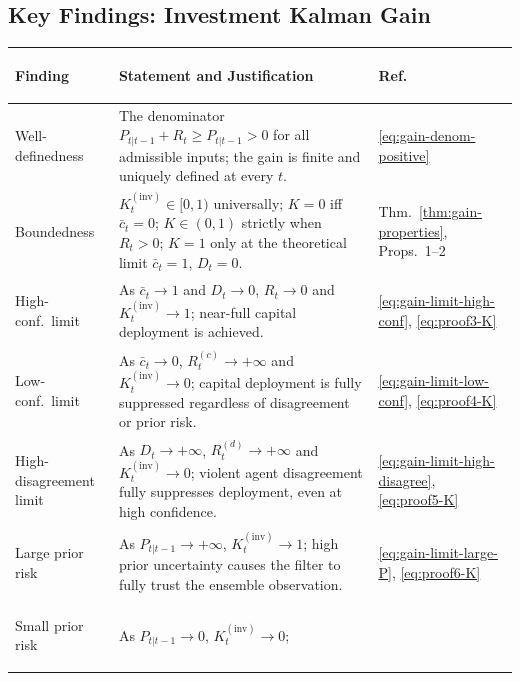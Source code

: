 \documentclass[12pt,openany]{book}
\numberwithin{equation}{chapter}
\theoremstyle{plain}
\theoremstyle{definition}
\theoremstyle{remark}
\renewcommand{\arraystretch}{1.2}
\begin{document}
\subsection{Key Findings: Investment Kalman Gain}

\begin{center}
\renewcommand{\arraystretch}{1.50}
\begin{tabularx}{\linewidth}{%
  >{\bfseries\raggedright\arraybackslash}p{3.8cm}
  >{\raggedright\arraybackslash}X
  >{\centering\arraybackslash}p{2.6cm}}
\hline
\textbf{Finding} & \textbf{Statement and Justification}
  & \textbf{Ref.} \\
\hline
Well-definedness
  & The denominator $P_{t|t-1} + R_t \geq P_{t|t-1} > 0$
    for all admissible inputs; the gain is finite and
    uniquely defined at every $t$.
  & \eqref{eq:gain-denom-positive} \\
\hline
Boundedness
  & $K_t^{(\mathrm{inv})} \in [0,1)$ universally;
    $K = 0$ iff $\bar{c}_t = 0$;
    $K \in (0,1)$ strictly when $R_t > 0$;
    $K = 1$ only at the theoretical limit
    $\bar{c}_t = 1$, $D_t = 0$.
  & Thm.~\ref{thm:gain-properties},
    Props.~1--2 \\
\hline
High-conf.\ limit
  & As $\bar{c}_t \to 1$ and $D_t \to 0$,
    $R_t \to 0$ and $K_t^{(\mathrm{inv})} \to 1$;
    near-full capital deployment is achieved.
  & \eqref{eq:gain-limit-high-conf},
    \eqref{eq:proof3-K} \\
\hline
Low-conf.\ limit
  & As $\bar{c}_t \to 0$,
    $R_t^{(c)} \to +\infty$ and
    $K_t^{(\mathrm{inv})} \to 0$;
    capital deployment is fully suppressed
    regardless of disagreement or prior risk.
  & \eqref{eq:gain-limit-low-conf},
    \eqref{eq:proof4-K} \\
\hline
High-disagreement limit
  & As $D_t \to +\infty$,
    $R_t^{(d)} \to +\infty$ and
    $K_t^{(\mathrm{inv})} \to 0$;
    violent agent disagreement fully suppresses
    deployment, even at high confidence.
  & \eqref{eq:gain-limit-high-disagree},
    \eqref{eq:proof5-K} \\
\hline
Large prior risk
  & As $P_{t|t-1} \to +\infty$,
    $K_t^{(\mathrm{inv})} \to 1$;
    high prior uncertainty causes the filter
    to fully trust the ensemble observation.
  & \eqref{eq:gain-limit-large-P},
    \eqref{eq:proof6-K} \\
\hline
Small prior risk
  & As $P_{t|t-1} \to 0$,
    $K_t^{(\mathrm{inv})} \to 0$;

\end{tabularx}
\end{center}
\end{document}
